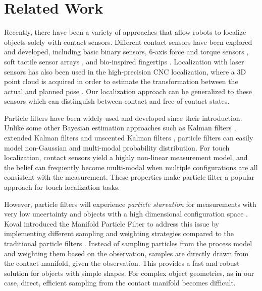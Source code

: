 \documentclass[letterpaper, 10 pt, conference]{ieeeconf}
\begin{document}
\section{Related Work}

%


Recently, there have been a variety of approaches that allow robots to localize objects solely with contact sensors. Different contact sensors have been explored and developed, including basic binary sensors, 6-axis force and torque sensors \cite{del2012control}, soft tactile sensor arrays \cite{hammond2012soft}, and bio-inspired fingertips \cite{fishel2012sensing}. Localization with laser sensors has also been used in the high-precision CNC localization, where a 3D point cloud is acquired in order to estimate the transformation between the actual and planned pose \cite{rajaraman2013automated}. Our localization approach can be generalized to these sensors which can distinguish between contact and free-of-contact states.

Particle filters have been widely used and developed since their introduction. 
Unlike some other Bayesian estimation approaches such as Kalman filters \cite{kalman1960new}, extended Kalman filters \cite{kalman1961new} and unscented Kalman filters \cite{julier1997new}, particle filters can easily model non-Gaussian and multi-modal probability distribution. 
For touch localization, contact sensors yield a highly non-linear measurement model, and the belief can frequently become multi-modal when multiple configurations are all consistent with the measurement. 
These properties make particle filter a popular approach for touch localization tasks. 

However, particle filters will experience \textit{particle starvation} for measurements with very low uncertainty and objects with a high dimensional configuration space \cite{Thrun2000}. 
Koval introduced the Manifold Particle Filter to address this issue by implementing different sampling and weighting strategies compared to the traditional particle filters \cite{Koval2011}\cite{ Koval2013}. 
Instead of sampling particles from the process model and weighting them based on the observation, samples are directly drawn from the contact manifold, given the observation. 
This provides a fast and robust solution for objects with simple shapes. 
For complex object geometries, as in our case, direct, efficient sampling from the contact manifold becomes difficult.
\end{document}
